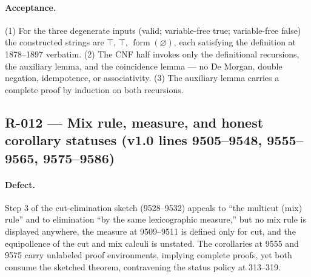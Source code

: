 \paragraph{Acceptance.} (1) For the three degenerate inputs (valid;
variable-free true; variable-free false) the constructed strings are
\(\top\), \(\top\), \(\operatorname{form}(\varnothing)\), each satisfying
the definition at 1878--1897 verbatim.  (2) The CNF half invokes only the
definitional recursions, the auxiliary lemma, and the coincidence lemma ---
no De Morgan, double negation, idempotence, or associativity.  (3) The
auxiliary lemma carries a complete proof by induction on both recursions.

\subsection*{R-012 --- Mix rule, measure, and honest corollary statuses (v1.0 lines 9505--9548, 9555--9565, 9575--9586)}

\paragraph{Defect.} Step 3 of the cut-elimination sketch (9528--9532)
appeals to ``the multicut (mix) rule'' and to elimination ``by the same
lexicographic measure,'' but no mix rule is displayed anywhere, the measure
at 9509--9511 is defined only for cut, and the equipollence of the cut and
mix calculi is unstated.  The corollaries at 9555 and 9575 carry unlabeled
proof environments, implying complete proofs, yet both consume the sketched
theorem, contravening the status policy at 313--319.

